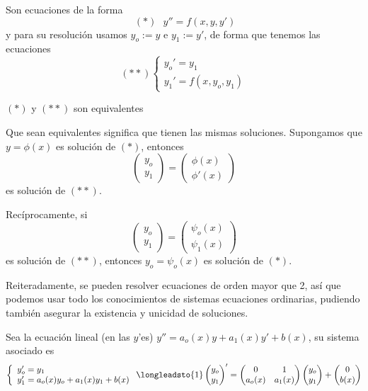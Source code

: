 Son ecuaciones de la forma $$\: \: (*)\: \: \boxed{\: y''=f(x,y,y') \: } $$ y para su resolución usamos $y_o:=y$ e $y_1:=y'$, de forma que tenemos las ecuaciones
$$(**)\left\{ \begin{array}{l}
     y_o'=y_1  \\
     y_1'=f(x,y_o,y_1) 
\end{array} \right.$$
\begin{prop}
    $(*)$ y $(**)$ son equivalentes
\end{prop}
\begin{dem}
    Que sean equivalentes significa que tienen las mismas soluciones. Supongamos que $y=\phi(x)$ es solución de $(*)$, entonces 
$$\begin{pmatrix}
    y_o \\ y_1
\end{pmatrix}=\begin{pmatrix}
    \phi(x) \\ \phi'(x)
\end{pmatrix}$$ es solución de $(**)$.

Recíprocamente, si
$$\begin{pmatrix}
    y_o \\ y_1
\end{pmatrix}=\begin{pmatrix}
    \psi_o(x) \\ \psi_1(x)
\end{pmatrix}$$
es solución de $(**)$, entonces $y_o=\psi_o(x)$ es solución de $(*)$.
\end{dem}
\begin{obs}
    Reiteradamente, se pueden resolver ecuaciones de orden mayor que 2, así que podemos usar todo los conocimientos de sistemas ecuaciones ordinarias, pudiendo también asegurar la existencia y unicidad de soluciones.
\end{obs}
\begin{eje}
    Sea la ecuación lineal (en las $y$'es) $y''=a_o(x)y+a_1(x)y'+b(x)$, su sistema asociado es
    $$\left\{ \begin{array}{l}
     y_o'=y_1  \\
     y_1'=a_o(x)y_o+a_1(x)y_1+b(x) 
\end{array} \right. \longleadsto{1} \begin{pmatrix}
    y_o \\ y_1
\end{pmatrix}'=\begin{pmatrix}
    0 & 1 \\
    a_o(x)& a_1(x)
\end{pmatrix} \begin{pmatrix}
    y_o \\ y_1 
\end{pmatrix}+\begin{pmatrix}
    0 \\ b(x)
\end{pmatrix}$$
\end{eje}

